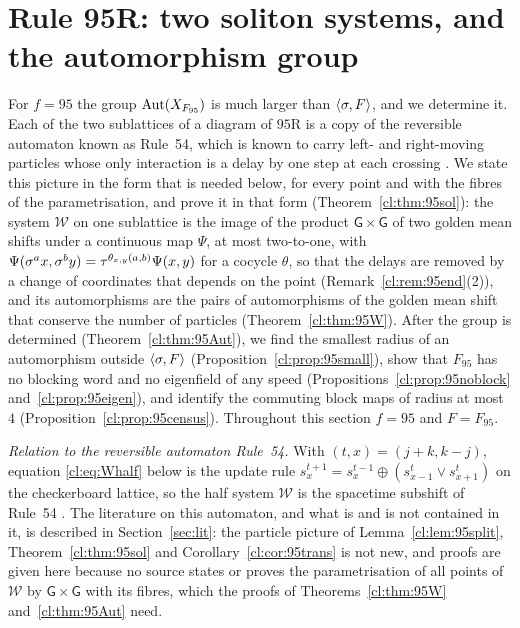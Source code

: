 \section{Rule 95R: two soliton systems, and the automorphism group}\label{cl:sec:95}

For $f=95$ the group $\operatorname{Aut}(X_{F_{95}})$ is much larger than $\langle\sigma,F\rangle$, and we determine it. Each of the two sublattices of a diagram of $95$R is a copy of the reversible automaton known as Rule~54, which is known to carry left- and right-moving particles whose only interaction is a delay by one step at each crossing \cite{BBGP1993}. We state this picture in the form that is needed below, for every point and with the fibres of the parametrisation, and prove it in that form (Theorem~\ref{cl:thm:95sol}): the system $\mathcal W$ on one sublattice is the image of the product $\mathsf G\times\mathsf G$ of two golden mean shifts under a continuous map $\Psi$, at most two-to-one, with $\Psi(\sigma^ax,\sigma^by)=\tau^{\theta_{x,y}(a,b)}\Psi(x,y)$ for a cocycle $\theta$, so that the delays are removed by a change of coordinates that depends on the point (Remark~\ref{cl:rem:95end}(2)), and its automorphisms are the pairs of automorphisms of the golden mean shift that conserve the number of particles (Theorem~\ref{cl:thm:95W}). After the group is determined (Theorem~\ref{cl:thm:95Aut}), we find the smallest radius of an automorphism outside $\langle\sigma,F\rangle$ (Proposition~\ref{cl:prop:95small}), show that $F_{95}$ has no blocking word and no eigenfield of any speed (Propositions~\ref{cl:prop:95noblock} and~\ref{cl:prop:95eigen}), and identify the commuting block maps of radius at most $4$ (Proposition~\ref{cl:prop:95census}). Throughout this section $f=95$ and $F=F_{95}$.

\emph{Relation to the reversible automaton Rule~54.} With $(t,x)=(j+k,k-j)$, equation \eqref{cl:eq:Whalf} below is the update rule $s_x^{t+1}=s_x^{t-1}\oplus(s_{x-1}^t\vee s_{x+1}^t)$ on the checkerboard lattice, so the half system $\mathcal W$ is the spacetime subshift of Rule~54 \cite{BBGP1993,BKP2021}. The literature on this automaton, and what is and is not contained in it, is described in Section~\ref{sec:lit}: the particle picture of Lemma~\ref{cl:lem:95split}, Theorem~\ref{cl:thm:95sol} and Corollary~\ref{cl:cor:95trans} is not new, and proofs are given here because no source states or proves the parametrisation of all points of $\mathcal W$ by $\mathsf G\times\mathsf G$ with its fibres, which the proofs of Theorems~\ref{cl:thm:95W} and~\ref{cl:thm:95Aut} need.

